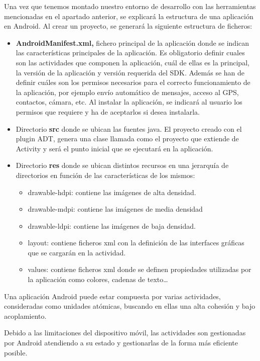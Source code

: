 Una vez que tenemos montado nuestro entorno de desarrollo con las herramientas mencionadas en el apartado anterior, se explicará la estructura de una aplicación en Android. Al crear un proyecto, se generará la siguiente estructura de ficheros:
\begin{itemize}
\item \textbf{AndroidManifest.xml,} fichero principal de la aplicación donde se indican las características principales de la aplicación. Es obligatorio definir cuales son las actividades que componen la aplicación, cuál de ellas es la principal, la versión de la aplicación y versión requerida del SDK. Además se han de definir cuáles son los permisos necesarios para el correcto funcionamiento de la aplicación, por ejemplo envío automático de mensajes, acceso al GPS, contactos, cámara,  etc. Al instalar la aplicación, se indicará al usuario los permisos que requiere y ha de aceptarlos si desea instalarla.
\item Directorio  \textbf{src} donde se ubican las fuentes java. El proyecto creado con el plugin ADT, genera una clase llamada como el proyecto que extiende de Activity y será el punto inicial que se ejecutará en la aplicación.
\item Directorio \textbf{res} donde se ubican distintos recursos en una jerarquía de directorios en función de las características de los mismos:
\begin{itemize}
\item drawable-hdpi: contiene las imágenes de alta densidad.
\item drawable-mdpi: contiene las imágenes de media densidad
\item drawable-ldpi: contiene las imágenes de baja densidad.
\item layout: contiene ficheros xml con la definición de las interfaces gráficas que se cargarán en la actividad.
\item values: contiene ficheros xml donde se definen propiedades utilizadas por la aplicación como colores, cadenas de texto\ldots
\end{itemize}
\end{itemize}

Una aplicación Android puede estar compuesta por varias actividades, consideradas como unidades atómicas, buscando en ellas una alta cohesión y bajo acoplamiento. 
\newline 

Debido a las limitaciones del dispositivo móvil, las actividades son gestionadas por Android atendiendo a su estado y gestionarlas de la forma más eficiente posible.
\newline

